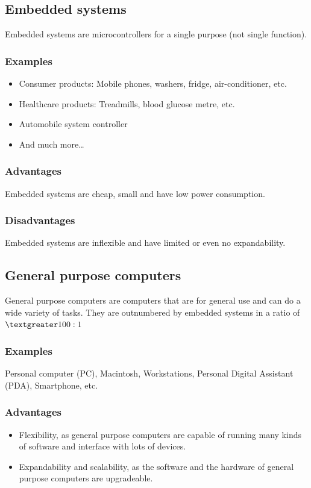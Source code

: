 \documentclass[11pt]{article}
\begin{document}
\subsection{Embedded systems}
\label{sec:org5a85230}
Embedded systems are microcontrollers for a single purpose (not single function).

\subsubsection{Examples}
\label{sec:orgb0ff5c2}
\begin{itemize}
\item Consumer products: Mobile phones, washers, fridge, air-conditioner, etc.
\item Healthcare products: Treadmills, blood glucose metre, etc.
\item Automobile system controller
\item And much more\ldots{}
\end{itemize}

\subsubsection{Advantages}
\label{sec:org4f89d9a}
Embedded systems are cheap, small and have low power consumption.

\subsubsection{Disadvantages}
\label{sec:orgbfe04ac}
Embedded systems are inflexible and have limited or even no expandability.

\subsection{General purpose computers}
\label{sec:org7c7305e}
General purpose computers are computers that are for general use and can do a wide variety of tasks. They are outnumbered by embedded systems in a ratio of \(\textgreater 100:1\)

\subsubsection{Examples}
\label{sec:orgb076b20}
Personal computer (PC), Macintosh, Workstations, Personal Digital Assistant (PDA), Smartphone, etc.

\subsubsection{Advantages}
\label{sec:orgdf890a7}
\begin{itemize}
\item Flexibility, as general purpose computers are capable of running many kinds of software and interface with lots of devices.
\item Expandability and scalability, as the software and the hardware of general purpose computers are upgradeable.
\end{itemize}
\end{document}
